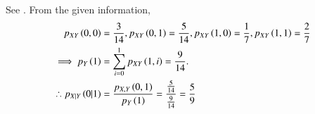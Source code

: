 \begin{table}[H]
	\centering
	
	\caption{}
	\label{tab:ncert/12/13/1/13/table1}
\end{table}
See . From the given information,
\begin{align}
	p_{XY}\left(0,0\right)&=\frac{3}{14},
	p_{XY}\left(0,1\right)=\frac{5}{14},
	p_{XY}\left(1,0\right)=\frac{1}{7},
	p_{XY}\left(1,1\right)=\frac{2}{7}
	\\
	\implies p_{Y}\left(1\right) &= \sum_{i=0}^{1}p_{XY}\left(1,i\right) = \frac{9}{14}.\\
	\therefore 
	p_{X|Y}\left(0|1\right)&=\frac{p_{X,Y}\left(0,1\right)}{p_Y\left(1\right)}
				=\frac{\frac{5}{14}}{\frac{9}{14}}
				=\frac{5}{9}
\end{align}
